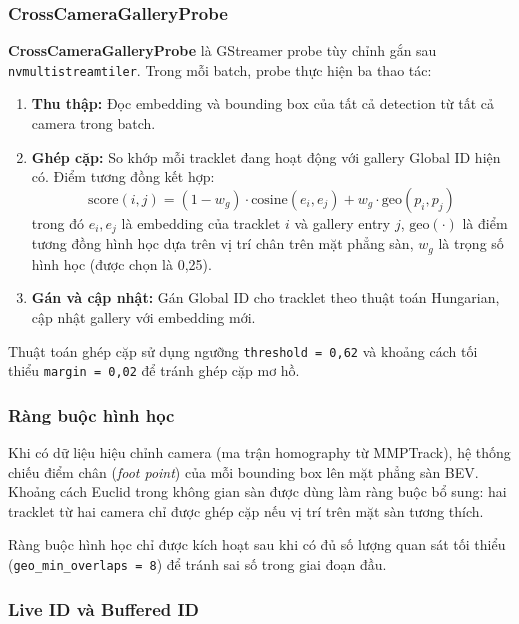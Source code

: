 \documentclass{article} %
\begin{document}
\subsubsection{CrossCameraGalleryProbe}

\textbf{CrossCameraGalleryProbe} là GStreamer probe tùy chỉnh gắn sau \texttt{nvmultistreamtiler}. Trong mỗi batch, probe thực hiện ba thao tác:

\begin{enumerate}
    \item \textbf{Thu thập:} Đọc embedding và bounding box của tất cả detection từ tất cả camera trong batch.
    \item \textbf{Ghép cặp:} So khớp mỗi tracklet đang hoạt động với gallery Global ID hiện có. Điểm tương đồng kết hợp:
    \begin{equation}\label{eq:score}
        \text{score}(i, j) = (1 - w_g) \cdot \text{cosine}(e_i, e_j) + w_g \cdot \text{geo}(p_i, p_j)
    \end{equation}
    trong đó $e_i, e_j$ là embedding của tracklet $i$ và gallery entry $j$, $\text{geo}(\cdot)$ là điểm tương đồng hình học dựa trên vị trí chân trên mặt phẳng sàn, $w_g$ là trọng số hình học (được chọn là 0{,}25).
    \item \textbf{Gán và cập nhật:} Gán Global ID cho tracklet theo thuật toán Hungarian, cập nhật gallery với embedding mới.
\end{enumerate}

Thuật toán ghép cặp sử dụng ngưỡng \texttt{threshold = 0{,}62} và khoảng cách tối thiểu \texttt{margin = 0{,}02} để tránh ghép cặp mơ hồ.

\subsubsection{Ràng buộc hình học}

Khi có dữ liệu hiệu chỉnh camera (ma trận homography từ MMPTrack), hệ thống chiếu điểm chân (\textit{foot point}) của mỗi bounding box lên mặt phẳng sàn BEV. Khoảng cách Euclid trong không gian sàn được dùng làm ràng buộc bổ sung: hai tracklet từ hai camera chỉ được ghép cặp nếu vị trí trên mặt sàn tương thích.

Ràng buộc hình học chỉ được kích hoạt sau khi có đủ số lượng quan sát tối thiểu (\texttt{geo\_min\_overlaps = 8}) để tránh sai số trong giai đoạn đầu.

\subsubsection{Live ID và Buffered ID}
\label{sec:buffered}
\end{document}
